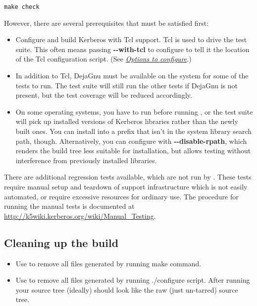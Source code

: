 \documentclass[letterpaper,10pt,english]{sphinxmanual}
\begin{document}
\begin{Verbatim}[commandchars=\\\{\}]
make check
\end{Verbatim}

However, there are several prerequisites that must be satisfied first:
\begin{itemize}
\item {} 
Configure and build Kerberos with Tcl support. Tcl is used to drive
the test suite.  This often means passing \textbf{-}\textbf{-with-tcl} to
configure to tell it the location of the Tcl configuration
script. (See {\hyperref[build/options2configure:options2configure]{\emph{Options to configure}}}.)

\item {} 
In addition to Tcl, DejaGnu must be available on the system for some
of the tests to run.  The test suite will still run the other tests
if DejaGnu is not present, but the test coverage will be reduced
accordingly.

\item {} 
On some operating systems, you have to run  before
running , or the test suite will pick up installed
versions of Kerberos libraries rather than the newly built ones.
You can install into a prefix that isn't in the system library
search path, though. Alternatively, you can configure with
\textbf{-}\textbf{-disable-rpath}, which renders the build tree less suitable for
installation, but allows testing without interference from
previously installed libraries.

\end{itemize}

There are additional regression tests available, which are not run
by .  These tests require manual setup and teardown of
support infrastructure which is not easily automated, or require
excessive resources for ordinary use.  The procedure for running
the manual tests is documented at
\href{http://k5wiki.kerberos.org/wiki/Manual\_Testing}{http://k5wiki.kerberos.org/wiki/Manual\_Testing}.


\subsection{Cleaning up the build}
\label{build/doing_build:cleaning-up-the-build}\begin{itemize}
\item {} 
Use  to remove all files generated by running make
command.

\item {} 
Use  to remove all files generated by running
./configure script.  After running  your source
tree (ideally) should look like the raw (just un-tarred) source
tree.

\end{itemize}
\end{document}
